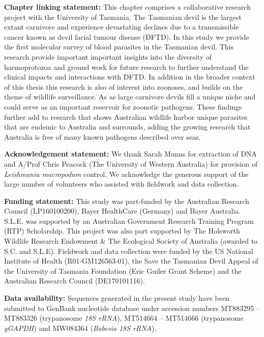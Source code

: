 \documentclass[a4paper, nobind]{templates/ociamthesis}
\begin{document}
\newpage

\textbf{Chapter linking statement:}
This chapter comprises a collaborative research project with the University of Tasmania. The Tasmanian devil is the largest extant carnivore and experience devastating declines due to a transmissible cancer known as devil facial tumour disease (DFTD). In this study we provide the first molecular survey of blood parasites in the Tasmanian devil. This research provide important important insights into the diversity of haemoprotozoa and ground work for future research to further understand the clinical impacts and interactions with DFTD. In addition in the broader context of this thesis this research is also of interest into zoonoses, and builds on the theme of wildlife surveillance. As as large carnivore devils fill a unique niche and could serve as an important reservoir for zoonotic pathogens. These findings further add to research that shows Australian wildlife harbor unique parasites that are endemic to Australia and surrounds, adding the growing research that Australia is free of many known pathogens described over seas.

\vspace{5mm}

\textbf{Acknowledgement statement:}
We thank Sarah Munns for extraction of DNA and A/Prof Chris Peacock (The University of Western Australia) for provision of \emph{Leishmania macropodum} control. We acknowledge the generous support of the large number of volunteers who assisted with fieldwork and data collection.

\vspace{5mm}

\textbf{Funding statement:} This study was part-funded by the Australian Research Council (LP160100200), Bayer HealthCare (Germany) and Bayer Australia. S.L.E. was supported by an Australian Government Research Training Program (RTP) Scholarship. This project was also part supported by The Holsworth Wildlife Research Endowment \& The Ecological Society of Australia (awarded to S.C. and S.L.E). Fieldwork and data collection were funded by the US National Institute of Health (R01-GM126563-01), the Save the Tasmanian Devil Appeal of the University of Tasmania Foundation (Eric Guiler Grant Scheme) and the Australian Research Council (DE170101116).

\vspace{5mm}

\textbf{Data availability:} Sequences generated in the present study have been submitted to GenBank nucleotide database under accession numbers MT883295 -- MT883326 (trypanosome \emph{18S rRNA}), MT514664 -- MT514666 (trypanosome \emph{gGAPDH}) and MW084364 (\emph{Babesia} \emph{18S rRNA}).
\end{document}
